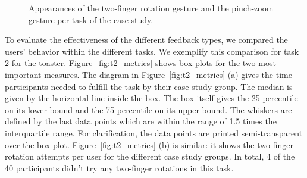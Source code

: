 \documentclass[manuscript]{acmart}
\begin{document}
			\begin{figure}[H]
				\centering
				\caption{Appearances of the two-finger rotation gesture and the pinch-zoom gesture per task of the case study.}
				\label{fig:tfr_v_pz}
			\end{figure}

			To evaluate the effectiveness of the different feedback types, we compared the users' behavior within the different tasks. We exemplify this comparison for task 2 for the toaster. Figure~\ref{fig:t2_metrics} shows box plots for the two most important measures. The diagram in Figure~\ref{fig:t2_metrics} (a) gives the time participants needed to fulfill the task by their case study group. The median is given by the horizontal line inside the box. The box itself gives the 25 percentile on its lower bound and the 75 percentile on its upper bound. The whiskers are defined by the last data points which are within the range of 1.5 times the interquartile range. For clarification, the data points are printed semi-transparent over the box plot. Figure~\ref{fig:t2_metrics} (b) is similar: it shows the two-finger rotation attempts per user for the different case study groups. In total, 4 of the 40 participants didn't try any two-finger rotations in this task.
\end{document}
